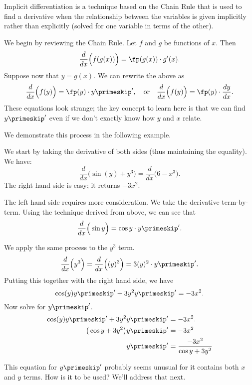 Implicit differentiation is a technique based on the Chain Rule that is used to find a derivative when the relationship between the variables is given implicitly rather than explicitly (solved for one variable in terms of the other).\bigskip

We begin by reviewing the Chain Rule. Let $f$ and $g$ be functions of $x$. Then \[\frac{d}{dx}\Big(f(g(x))\Big) = \fp(g(x))\cdot g'(x).\]
Suppose now that $y=g(x)$. We can rewrite the above as
\begin{equation}
\frac{d}{dx}\Big(f(y)\Big) = \fp(y)\cdot y\primeskip', \quad \text{or}\quad
\frac{d}{dx}\Big(f(y)\Big) = \fp(y)\cdot \frac{dy}{dx} .\label{eq:implicit1}
\end{equation}
These equations look strange; the key concept to learn here is that we can find $y\primeskip'$ even if we don't exactly know how $y$ and $x$ relate.\\


We demonstrate this process in the following example.

{We start by taking the derivative of both sides (thus maintaining the equality). We have:
\[\frac{d}{dx}\Big(\sin(y) + y^3\Big)=\frac{d}{dx}\Big(6-x^3\Big).\]
The right hand side is easy; it returns $-3x^2$. 

The left hand side requires more consideration. We take the derivative term-by-term.  Using the technique derived from  above, we can see that
\[\frac{d}{dx}\Big(\sin y\Big) = \cos y \cdot y\primeskip'.\] %

We apply the same process to the $y^3$ term. 
\[
\frac{d}{dx}\Big(y^3\Big) = \frac{d}{dx}\Big((y)^3\Big) = 3(y)^2\cdot y\primeskip'.
\]
Putting this together with the right hand side, we have
\[\cos(y)y\primeskip'+3y^2y\primeskip' = -3x^2.\]
Now solve for $y\primeskip'$.
\begin{align*}
	\cos(y)y\primeskip'+3y^2y\primeskip' 	&= -3x^2.\\
	\big(\cos y+3y^2\big)y\primeskip' &=	-3x^2\\
	y\primeskip'&=	\frac{-3x^2}{\cos y+3y^2}
\end{align*}

This equation for $y\primeskip'$ probably seems unusual for it contains both $x$ and $y$ terms. How is it to be used? We'll address that next.}


